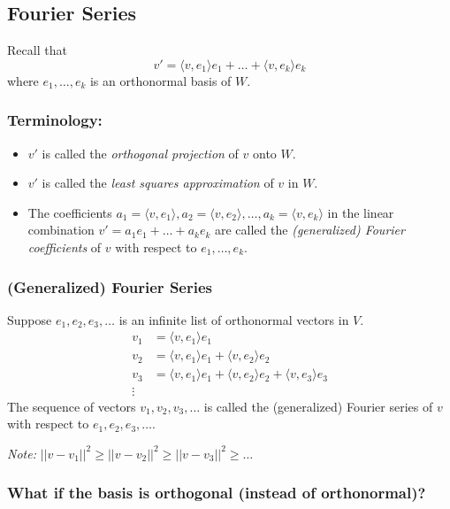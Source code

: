 \documentclass[11pt]{article}
\begin{document}
    \subsection{Fourier Series}

    Recall that \[v' = \langle v,e_1 \rangle e_1 + \dots + \langle v, e_k \rangle e_k\] where \(e_1, \dots, e_k\) is an orthonormal basis of $W$. 

    \subsubsection{Terminology:}
    \begin{itemize}
        \item \(v'\) is called the \emph{orthogonal projection} of $v$ onto $W$.
        \item \(v'\) is called the \emph{least squares approximation} of $v$ in $W$.
        \item The coefficients \(a_1 = \langle v, e_1 \rangle, a_2 = \langle v, e_2 \rangle, \dots, a_k = \langle v, e_k \rangle\) in the linear combination \(v' = a_1 e_1 + \dots + a_k e_k\) are called the \emph{(generalized) Fourier coefficients} of $v$ with respect to \(e_1, \dots, e_k\).
    \end{itemize}

    \subsubsection{(Generalized) Fourier Series}

    Suppose \(e_1, e_2, e_3, \dots\) is an infinite list of orthonormal vectors in $V$. 
    \begin{align*}
        v_1 &= \langle v, e_1 \rangle e_1 \\
        v_2 &= \langle v, e_1 \rangle e_1 + \langle v, e_2 \rangle e_2 \\
        v_3 &= \langle v, e_1 \rangle e_1 + \langle v, e_2 \rangle e_2 + \langle v, e_3 \rangle e_3 \\
        \vdots &
    \end{align*}
    The sequence of vectors \(v_1, v_2, v_3, \dots\) is called the (generalized) Fourier series of $v$ with respect to \(e_1, e_2, e_3, \dots\). 

    \vspace{1em}

    \emph{Note:} \(||v-v_1||^2 \geq ||v-v_2||^2 \geq ||v-v_3||^2 \geq \dots\)

    \subsubsection{What if the basis is orthogonal (instead of orthonormal)?}
\end{document}
